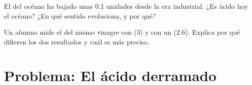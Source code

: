 \begin{exercise}[$\star\star\star$]\label{exo:g9:acids-bases-ph:11}
El  del océano ha bajado unas 0.1 unidades desde la era industrial.
¿Es ácido hoy el océano? ¿En qué sentido evoluciona, y por qué?
\end{exercise}

\begin{exercise}[$\star\star\star$]\label{exo:g9:acids-bases-ph:12}
Un alumno mide el  del mismo vinagre con  (3) y con un
 (2.6). Explica por qué difieren los dos resultados y cuál es más
preciso.
\end{exercise}

\section{Problema: El ácido derramado}

